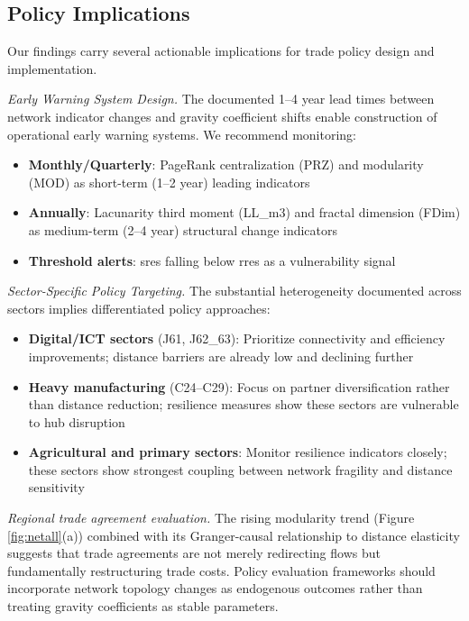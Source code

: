 \documentclass[preprint, 3p,
authoryear]{elsarticle} %
\begin{document}
\subsection{Policy Implications}\label{subsec:policy}

Our findings carry several actionable implications for trade policy
design and implementation.

\textit{Early Warning System Design.} The documented 1--4 year lead
times between network indicator changes and gravity coefficient shifts
enable construction of operational early warning systems. We recommend
monitoring:

\begin{itemize}
    \item \textbf{Monthly/Quarterly}: PageRank centralization (PRZ) and modularity (MOD) as short-term (1--2 year) leading indicators
    \item \textbf{Annually}: Lacunarity third moment (LL\_m3) and fractal dimension (FDim) as medium-term (2--4 year) structural change indicators
    \item \textbf{Threshold alerts}: \gls{sres} falling     below \gls{rres} as a vulnerability signal
\end{itemize}

\textit{Sector-Specific Policy Targeting.} The substantial heterogeneity
documented across sectors implies differentiated policy approaches:

\begin{itemize}
    \item \textbf{Digital/ICT sectors} (J61, J62\_63): Prioritize connectivity and efficiency improvements; distance barriers are already low and declining further
    \item \textbf{Heavy manufacturing} (C24--C29): Focus on partner diversification rather than distance reduction; resilience measures show these sectors are vulnerable to hub disruption
    \item \textbf{Agricultural and primary sectors}: Monitor resilience indicators closely; these sectors show strongest coupling between network fragility and distance sensitivity
\end{itemize}

\textit{Regional trade agreement evaluation.} The rising modularity
trend (Figure \ref{fig:netall}(a)) combined with its Granger-causal
relationship to distance elasticity suggests that trade agreements are
not merely redirecting flows but fundamentally restructuring trade
costs. Policy evaluation frameworks should incorporate network topology
changes as endogenous outcomes rather than treating gravity coefficients
as stable parameters.
\end{document}
